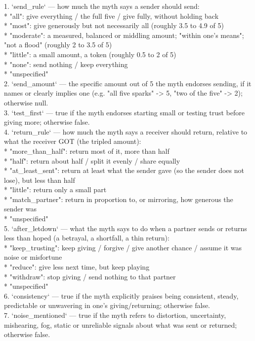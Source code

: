 \begin{promptbox}
1. `send\_rule` — how much the myth says a sender should send:\\
* "all": give everything / the full five / give fully, without holding back\\
* "most": give generously but not necessarily all (roughly 3.5 to 4.9 of 5)\\
* "moderate": a measured, balanced or middling amount; "within one's means"; "not a flood" (roughly 2 to 3.5 of 5)\\
* "little": a small amount, a token (roughly 0.5 to 2 of 5)\\
* "none": send nothing / keep everything\\
* "unspecified"\\
2. `send\_amount` — the specific amount out of 5 the myth endorses sending, if it names or clearly implies one (e.g. "all five sparks" -> 5, "two of the five" -> 2); otherwise null.\\
3. `test\_first` — true if the myth endorses starting small or testing trust before giving more; otherwise false.\\
4. `return\_rule` — how much the myth says a receiver should return, relative to what the receiver GOT (the tripled amount):\\
* "more\_than\_half": return most of it, more than half\\
* "half": return about half / split it evenly / share equally\\
* "at\_least\_sent": return at least what the sender gave (so the sender does not lose), but less than half\\
* "little": return only a small part\\
* "match\_partner": return in proportion to, or mirroring, how generous the sender was\\
* "unspecified"\\
5. `after\_letdown` — what the myth says to do when a partner sends or returns less than hoped (a betrayal, a shortfall, a thin return):\\
* "keep\_trusting": keep giving / forgive / give another chance / assume it was noise or misfortune\\
* "reduce": give less next time, but keep playing\\
* "withdraw": stop giving / send nothing to that partner\\
* "unspecified"\\
6. `consistency` — true if the myth explicitly praises being consistent, steady, predictable or unwavering in one's giving/returning; otherwise false.\\
7. `noise\_mentioned` — true if the myth refers to distortion, uncertainty, mishearing, fog, static or unreliable signals about what was sent or returned; otherwise false.


\end{promptbox}
